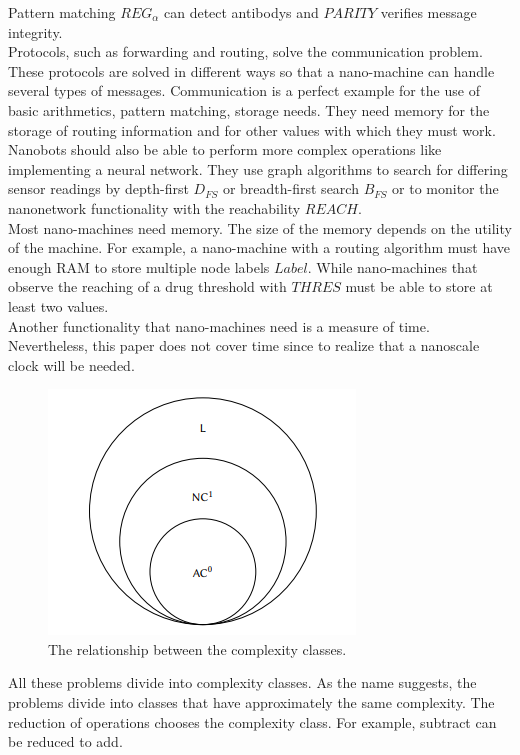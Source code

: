 \documentclass[10pt,sigconf]{acmart}
\begin{document}
Pattern matching $REG_{\alpha}$ can detect antibodys and $PARITY$ verifies message integrity.\\
Protocols, such as forwarding and routing, solve the communication problem. 
These protocols are solved in different ways so that a nano-machine can handle several types of messages.
Communication is a perfect example for the use of basic arithmetics, pattern matching, storage needs.
They need memory for the storage of routing information and for other values with which they must work.\\
Nanobots should also be able to perform more complex operations like implementing a neural network.
They use graph algorithms to search for differing sensor readings by depth-first $D_{FS}$ or breadth-first search $B_{FS}$ or to monitor the nanonetwork functionality with the reachability $REACH$.\\
Most nano-machines need memory. The size of the memory depends on the utility of the machine.
For example, a nano-machine with a routing algorithm must have enough RAM to store multiple node labels $Label$.
While nano-machines that observe the reaching of a drug threshold with $THRES$ must be able to store at least two values.\\
Another functionality that nano-machines need is a measure of time.
Nevertheless, this paper does not cover time since to realize that a nanoscale clock will be needed.\\
\begin{figure}[h!]
  \centering
  \includegraphics[scale=1]{ComplexityClasses.PNG}
\caption[]{The relationship between the complexity classes.\cite{lau2017computational}}
\label{complex}
\end{figure}
All these problems divide into complexity classes.
As the name suggests, the problems divide into classes that have approximately the same complexity.
The reduction of operations chooses the complexity class. For example, subtract can be reduced to add. 
\end{document}
